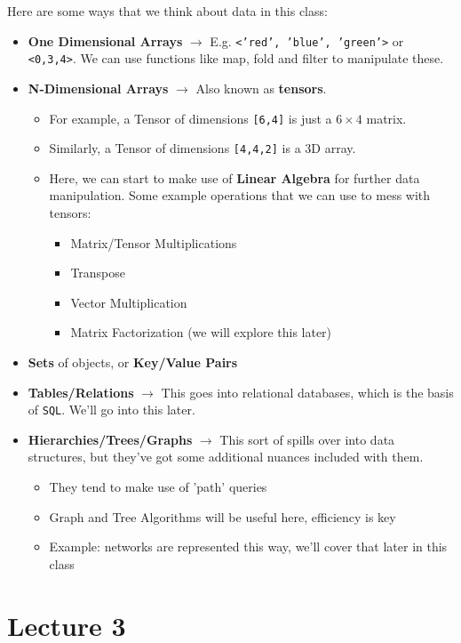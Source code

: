 \documentclass[english, 10pt]{article}
\begin{document}
Here are some ways that we think about data in this class:\newline

\begin{itemize}
	\item \textbf{One Dimensional Arrays} $\rightarrow$ E.g. \texttt{<'red', 'blue', 'green'>} or \texttt{<0,3,4>}. We can use functions like map, fold and filter to manipulate these.
	\item \textbf{N-Dimensional Arrays} $\rightarrow$ Also known as \textbf{tensors}.
	\begin{itemize}
		\item For example, a Tensor of dimensions \texttt{[6,4]} is just a $6\times 4$ matrix.
		\item Similarly, a Tensor of dimensions \texttt{[4,4,2]} is a 3D array.
		\item Here, we can start to make use of \textbf{Linear Algebra} for further data manipulation. Some example operations that we can use to mess with tensors:
		\begin{itemize}
			\item Matrix/Tensor Multiplications
			\item Transpose
			\item Vector Multiplication
			\item Matrix Factorization (we will explore this later)
		\end{itemize}
	\end{itemize}
	\item \textbf{Sets} of objects, or \textbf{Key/Value Pairs}
	\item \textbf{Tables/Relations} $\rightarrow$ This goes into relational databases, which is the basis of \texttt{SQL}. We'll go into this later.
	\item \textbf{Hierarchies/Trees/Graphs} $\rightarrow$ This sort of spills over into data structures, but they've got some additional nuances included with them.
	\begin{itemize}
		\item They tend to make use of 'path' queries
		\item Graph and Tree Algorithms will be useful here, efficiency is key
		\item Example: networks are represented this way, we'll cover that later in this class
	\end{itemize}
\end{itemize}

\section{Lecture 3}
\end{document}
